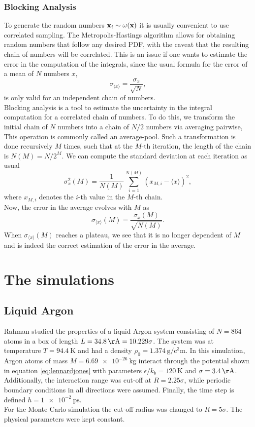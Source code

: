\documentclass[%
aps,
pra,%
amsmath,amssymb,
preprint,%
reprint,%
notitlepage,
a4paper]{revtex4-1}
\newcommand{\average}[1]{\langle #1 \rangle}
\begin{document}
\subsubsection{Blocking Analysis}
To generate the random numbers $\vb{x}_i \sim \omega(\vb{x})$ it is usually convenient to use correlated sampling. The Metropolis-Hastings \cite{Metropolis1953, Hastings1970} algorithm allows for obtaining random numbers that follow any desired PDF, with the caveat that the resulting chain of numbers will be correlated. This is an issue if one wants to estimate the error in the computation of the integrals, since the usual formula for the error of a mean of $N$ numbers $x$,
\begin{equation}
\sigma_{\average{x}} = \frac{\sigma_x}{\sqrt{N}},
\end{equation}
is only valid for an independent chain of numbers.\\
Blocking analysis is a tool to estimate the uncertainty in the integral computation for a correlated chain of numbers. To do this, we transform the initial chain of $N$ numbers into a chain of $N/2$ numbers via averaging pairwise, This operation is commonly called an average-pool. Such a transformation is done recursively $M$ times, such that at the $M$-th iteration, the length of the chain is $N(M) = N/2^M$. We can compute the standard deviation at each iteration as usual
\begin{equation}
\sigma_{x}^2(M) = \frac{1}{N(M)}\sum_{i=1}^{N(M)}(x_{M,i} - \average{x})^2,
\end{equation}
where $x_{M,i}$ denotes the $i$-th value in the $M$-th chain.\\
Now, the error in the average evolves with $M$ as 
\begin{equation}
\sigma_{\average{x}}(M) = \frac{\sigma_x(M)}{\sqrt{N(M)}}.
\end{equation}
When $\sigma_{\average{x}}(M)$ reaches a plateau, we see that it is no longer dependent of $M$ and is indeed the correct estimation of the error in the average.
\section{The simulations}
\subsection{Liquid Argon}
Rahman\cite{Rahman1964} studied the properties of a liquid Argon system consisting of $N=864$ atoms in a box of length $L = \SI{34.8}{\AA} = 10.229\sigma$. The system was at temperature $T = \SI{94.4}{\kelvin}$ and had a density $\rho_0 = \SI{1.374}{\gram\per\cubic\centi\meter}$. In this simulation, Argon atoms of mass $M = \SI{6.69e-26}{\kilogram}$ interact through the potential shown in equation \ref{eq:lennardjones} with parameters $\epsilon/k_b = \SI{120}{\kelvin}$ and $\sigma = \SI{3.4}{\AA}$. Additionally, the interaction range was cut-off at $R = 2.25\sigma$, while periodic boundary conditions in all directions were assumed. Finally, the time step is defined $h = \SI{1e-2}{\pico\second}$.\\
For the Monte Carlo simulation the cut-off radius was changed to $R = 5\sigma$. The physical parameters were kept constant.
\end{document}
